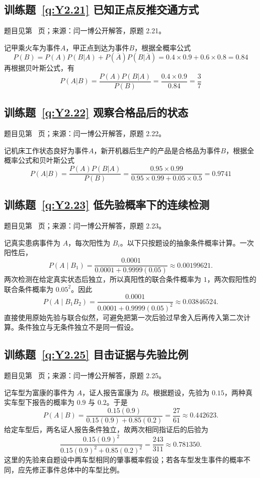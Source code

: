 \subsection*{训练题~\ref{q:Y2.21} 已知正点反推交通方式}\label{a:Y2.21}{\small 题目见第~\pageref{q:Y2.21} 页；来源：闫一博公开解答，原题 2.21。}
\begin{solve}
记甲乘火车为事件$A$，甲正点到达为事件$B$，根据全概率公式
\[P(B) = P(A)P(B|A) + P(\overline A )P(B|\overline A ) = 0.4 \times 0.9 + 0.6 \times 0.8 = 0.84\]
再根据贝叶斯公式，有
\[P(A|B) = \frac{{P(A)P(B|A)}}{{P(B)}} = \frac{{0.4 \times 0.9}}{{0.84}} = \frac{3}{7}\]
\end{solve}

\subsection*{训练题~\ref{q:Y2.22} 观察合格品后的状态}\label{a:Y2.22}{\small 题目见第~\pageref{q:Y2.22} 页；来源：闫一博公开解答，原题 2.22。}
\begin{solve}
记机床工作状态良好为事件$A$，新开机器后生产的产品是合格品为事件$B$，根据全概率公式和贝叶斯公式
\[P(A|B) = \frac{{P(A)P(B|A)}}{{P(B)}} = \frac{{0.95 \times 0.99}}{{0.95 \times 0.99 + 0.05 \times 0.5}} = 0.9741\]
\end{solve}

\subsection*{训练题~\ref{q:Y2.23} 低先验概率下的连续检测}\label{a:Y2.23}{\small 题目见第~\pageref{q:Y2.23} 页；来源：闫一博公开解答，原题 2.23。}
\begin{solve}记真实患病事件为 $A$，每次阳性为 $B_i$。以下只按题设的抽象条件概率计算。一次阳性后，\[P(A\mid B_1)=\frac{0.0001}{0.0001+0.9999(0.05)}\approx0.00199621.\]两次检测在给定真实状态后独立，所以真阳性的联合条件概率为 $1$，两次假阳性的联合条件概率为 $0.05^2$。因此\[P(A\mid B_1B_2)=\frac{0.0001}{0.0001+0.9999(0.05)^2}\approx0.03846524.\]直接使用原始先验与联合似然，可避免把第一次后验过早舍入后再传入第二次计算。条件独立与无条件独立不是同一假设。\end{solve}

\subsection*{训练题~\ref{q:Y2.25} 目击证据与先验比例}\label{a:Y2.25}{\small 题目见第~\pageref{q:Y2.25} 页；来源：闫一博公开解答，原题 2.25。}
\begin{solve}记车型为富康的事件为 $A$，证人报告富康为 $B$。根据题设，先验为 $0.15$，两种真实车型下报告的概率为 $0.9$ 与 $0.2$。于是\[P(A\mid B)=\frac{0.15(0.9)}{0.15(0.9)+0.85(0.2)}=\frac{27}{61}\approx0.442623.\]给定车型后，两名证人报告条件独立，故两次相同指证后的后验为\[\frac{0.15(0.9)^2}{0.15(0.9)^2+0.85(0.2)^2}=\frac{243}{311}\approx0.781350.\]这里的先验来自题设中两车型相同的肇事概率假设；若各车型发生事件的概率不同，应先修正事件总体中的车型比例。\end{solve}

